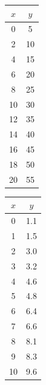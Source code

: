 \noindent
\begin{minipage}[t]{0.48\columnwidth}
\centering
\begin{tabular}{c|c}
$x$ & $y$ \\
\hline
0  & 5  \\
2  & 10 \\
4  & 15 \\
6  & 20 \\
8  & 25 \\
10 & 30 \\
12 & 35 \\
14 & 40 \\
16 & 45 \\
18 & 50 \\
20 & 55 \\
\end{tabular}
\end{minipage}
\hfill
\begin{minipage}[t]{0.48\columnwidth}
\centering
\begin{tabular}{c|c}
$x$ & $y$ \\
\hline
0 & 1.1 \\
1 & 1.5 \\
2 & 3.0 \\
3 & 3.2 \\
4 & 4.6 \\
5 & 4.8 \\
6 & 6.4 \\
7 & 6.6 \\
8 & 8.1 \\
9 & 8.3 \\
10 & 9.6 \\
\end{tabular}
\end{minipage}


